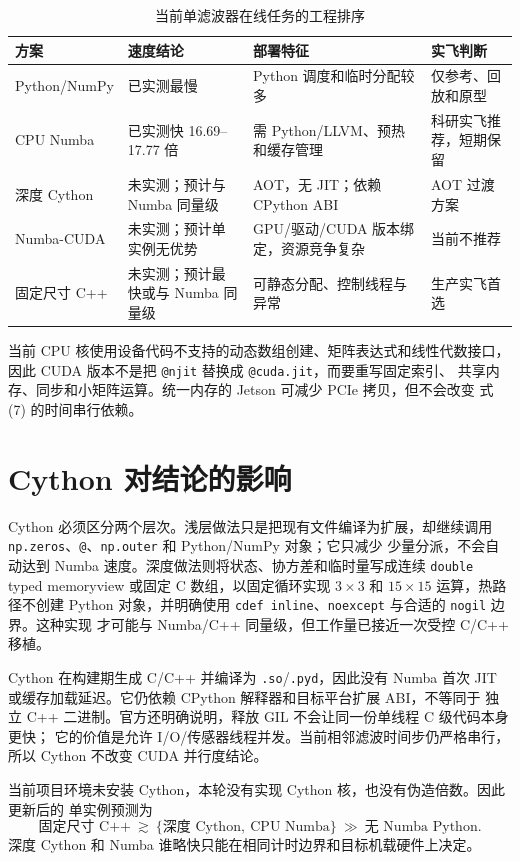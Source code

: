 \documentclass[11pt,a4paper]{ctexart}
\begin{document}
\begin{table}[H]
\centering
\small
\caption{当前单滤波器在线任务的工程排序}
\begin{tabular}{p{2.5cm}p{3.0cm}p{3.5cm}p{4.7cm}}
\toprule
方案 & 速度结论 & 部署特征 & 实飞判断\\
\midrule
Python/NumPy & 已实测最慢 & Python 调度和临时分配较多 & 仅参考、回放和原型\\
CPU Numba & 已实测快 16.69--17.77 倍 & 需 Python/LLVM、预热和缓存管理 &
科研实飞推荐，短期保留\\
深度 Cython & 未实测；预计与 Numba 同量级 & AOT，无 JIT；依赖 CPython ABI &
AOT 过渡方案\\
Numba-CUDA & 未实测；预计单实例无优势 & GPU/驱动/CUDA 版本绑定，资源竞争复杂 &
当前不推荐\\
固定尺寸 C++ & 未实测；预计最快或与 Numba 同量级 & 可静态分配、控制线程与异常 &
生产实飞首选\\
\bottomrule
\end{tabular}
\end{table}

当前 CPU 核使用设备代码不支持的动态数组创建、矩阵表达式和线性代数接口，因此
CUDA 版本不是把 \texttt{@njit} 替换成 \texttt{@cuda.jit}，而要重写固定索引、
共享内存、同步和小矩阵运算。统一内存的 Jetson 可减少 PCIe 拷贝，但不会改变
式 (7) 的时间串行依赖。

\section{Cython 对结论的影响}

Cython 必须区分两个层次。浅层做法只是把现有文件编译为扩展，却继续调用
\texttt{np.zeros}、\texttt{@}、\texttt{np.outer} 和 Python/NumPy 对象；它只减少
少量分派，不会自动达到 Numba 速度。深度做法则将状态、协方差和临时量写成连续
\texttt{double} typed memoryview 或固定 C 数组，以固定循环实现 $3\times3$ 和
$15\times15$ 运算，热路径不创建 Python 对象，并明确使用
\texttt{cdef inline}、\texttt{noexcept} 与合适的 \texttt{nogil} 边界。这种实现
才可能与 Numba/C++ 同量级，但工作量已接近一次受控 C/C++ 移植。

Cython 在构建期生成 C/C++ 并编译为 \texttt{.so}/\texttt{.pyd}，因此没有 Numba
首次 JIT 或缓存加载延迟。它仍依赖 CPython 解释器和目标平台扩展 ABI，不等同于
独立 C++ 二进制。官方还明确说明，释放 GIL 不会让同一份单线程 C 级代码本身更快；
它的价值是允许 I/O/传感器线程并发。当前相邻滤波时间步仍严格串行，所以 Cython
不改变 CUDA 并行度结论。

当前项目环境未安装 Cython，本轮没有实现 Cython 核，也没有伪造倍数。因此更新后的
单实例预测为
\begin{equation}
 \boxed{\text{固定尺寸 C++}\ \gtrsim\
 \{\text{深度 Cython},\ \text{CPU Numba}\}
 \ \gg\ \text{无 Numba Python}.}
\end{equation}
深度 Cython 和 Numba 谁略快只能在相同计时边界和目标机载硬件上决定。
\end{document}
